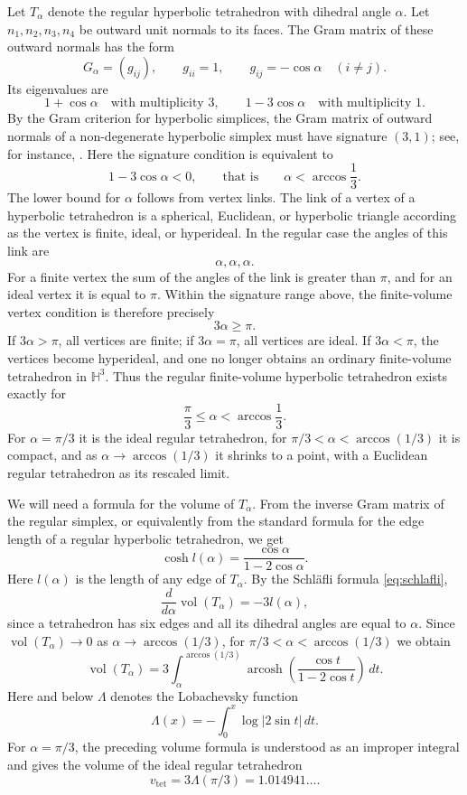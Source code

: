 \documentclass[12pt,a4paper]{article}
\theoremstyle{definition}
\DeclareMathOperator{\Vol}{vol}
\DeclareMathOperator{\arcosh}{arcosh}
\newcommand{\HH}{\mathbb H}
\newcommand{\vtet}{v_{\mathrm{tet}}}
\newcommand{\Lob}{\Lambda}
\begin{document}
Let \(T_\alpha\) denote the regular hyperbolic tetrahedron with dihedral angle \(\alpha\). Let \(n_1,n_2,n_3,n_4\) be outward unit normals to its faces. The Gram matrix of these outward normals has the form
\[
        G_\alpha=(g_{ij}),\qquad
        g_{ii}=1,\qquad
        g_{ij}=-\cos\alpha\quad (i\ne j).
\]
Its eigenvalues are
\[
        1+\cos\alpha
        \quad\text{with multiplicity }3,
        \qquad
        1-3\cos\alpha
        \quad\text{with multiplicity }1.
\]
By the Gram criterion for hyperbolic simplices, the Gram matrix of outward normals of a non-degenerate hyperbolic simplex must have signature \((3,1)\); see, for instance, \cite[Ch.~II, Sec.~3]{VinbergGeometry}. Here the signature condition is equivalent to
\[
        1-3\cos\alpha<0,
        \qquad\text{that is}\qquad
        \alpha<\arccos\frac13 .
\]
The lower bound for \(\alpha\) follows from vertex links. The link of a vertex of a hyperbolic tetrahedron is a spherical, Euclidean, or hyperbolic triangle according as the vertex is finite, ideal, or hyperideal. In the regular case the angles of this link are
\[
        \alpha,\alpha,\alpha .
\]
For a finite vertex the sum of the angles of the link is greater than \(\pi\), and for an ideal vertex it is equal to \(\pi\). Within the signature range above, the finite-volume vertex condition is therefore precisely
\[
        3\alpha\ge \pi .
\]
If \(3\alpha>\pi\), all vertices are finite; if \(3\alpha=\pi\), all vertices are ideal. If \(3\alpha<\pi\), the vertices become hyperideal, and one no longer obtains an ordinary finite-volume tetrahedron in \(\HH^3\). Thus the regular finite-volume hyperbolic tetrahedron exists exactly for
\[
        \frac{\pi}{3}\le\alpha<\arccos\frac13 .
\]
For \(\alpha=\pi/3\) it is the ideal regular tetrahedron, for \(\pi/3<\alpha<\arccos(1/3)\) it is compact, and as \(\alpha\to\arccos(1/3)\) it shrinks to a point, with a Euclidean regular tetrahedron as its rescaled limit.

We will need a formula for the volume of \(T_\alpha\). From the inverse Gram matrix of the regular simplex, or equivalently from the standard formula for the edge length of a regular hyperbolic tetrahedron, we get
\[
        \cosh l(\alpha)=\frac{\cos\alpha}{1-2\cos\alpha}.
\]
Here \(l(\alpha)\) is the length of any edge of \(T_\alpha\). By the Schl\"afli formula \eqref{eq:schlafli},
\[
        \frac{d}{d\alpha}\Vol(T_\alpha)=-3l(\alpha),
\]
since a tetrahedron has six edges and all its dihedral angles are equal to \(\alpha\). Since \(\Vol(T_\alpha)\to0\) as \(\alpha\to\arccos(1/3)\), for \(\pi/3<\alpha<\arccos(1/3)\) we obtain
\begin{equation}\label{eq:tet-volume}
        \Vol(T_\alpha)=
        3\int_\alpha^{\arccos(1/3)}
        \arcosh\left(
        \frac{\cos t}{1-2\cos t}
        \right)\,dt .
\end{equation}
Here and below \(\Lambda\) denotes the Lobachevsky function
\[
        \Lambda(x)=-\int_0^x\log|2\sin t|\,dt.
\]
For \(\alpha=\pi/3\), the preceding volume formula is understood as an
improper integral and gives the volume of the ideal regular tetrahedron
\[
        \vtet=3\Lob(\pi/3)=1.014941\ldots .
\]
\end{document}
